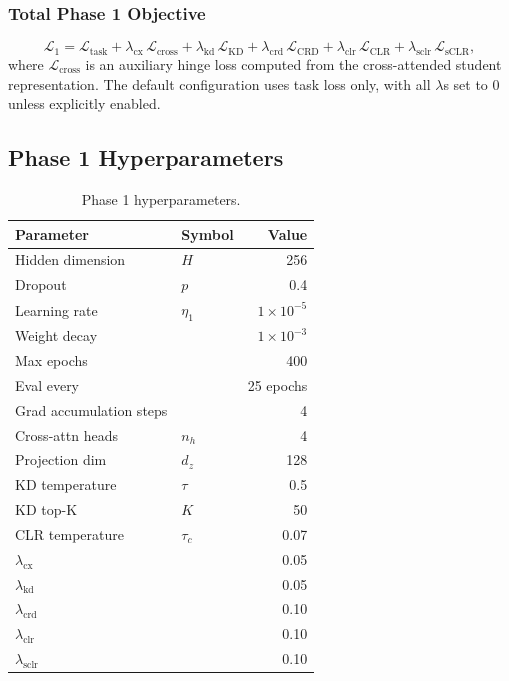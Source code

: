 \documentclass[11pt,a4paper]{article}
\begin{document}
\subsubsection{Total Phase 1 Objective}

\begin{equation}
    \mathcal{L}_1 = \mathcal{L}_\text{task}
        + \lambda_\text{cx}\,\mathcal{L}_\text{cross}
        + \lambda_\text{kd}\,\mathcal{L}_\text{KD}
        + \lambda_\text{crd}\,\mathcal{L}_\text{CRD}
        + \lambda_\text{clr}\,\mathcal{L}_\text{CLR}
        + \lambda_\text{sclr}\,\mathcal{L}_\text{sCLR},
    \label{eq:p1_total}
\end{equation}
where $\mathcal{L}_\text{cross}$ is an auxiliary hinge loss computed from the
cross-attended student representation.
The default configuration uses task loss only, with all $\lambda$s set to 0
unless explicitly enabled.

\subsection{Phase 1 Hyperparameters}

\begin{table}[h]
\centering
\caption{Phase 1 hyperparameters.}
\label{tab:p1_hparams}
\begin{tabular}{llr}
\toprule
Parameter & Symbol & Value \\
\midrule
Hidden dimension & $H$ & 256 \\
Dropout & $p$ & 0.4 \\
Learning rate & $\eta_1$ & $1\times10^{-5}$ \\
Weight decay & & $1\times10^{-3}$ \\
Max epochs & & 400 \\
Eval every & & 25 epochs \\
Grad accumulation steps & & 4 \\
Cross-attn heads & $n_h$ & 4 \\
Projection dim & $d_z$ & 128 \\
KD temperature & $\tau$ & 0.5 \\
KD top-K & $K$ & 50 \\
CLR temperature & $\tau_c$ & 0.07 \\
$\lambda_\text{cx}$ & & 0.05 \\
$\lambda_\text{kd}$ & & 0.05 \\
$\lambda_\text{crd}$ & & 0.10 \\
$\lambda_\text{clr}$ & & 0.10 \\
$\lambda_\text{sclr}$ & & 0.10 \\
\bottomrule
\end{tabular}
\end{table}
\end{document}
